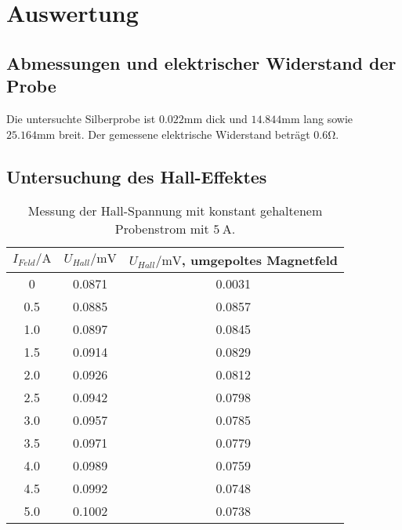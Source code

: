 \section{Auswertung}
  \subsection{Abmessungen und elektrischer Widerstand der Probe}
    Die untersuchte Silberprobe ist $0.022 \si{\milli\meter}$ dick und $14.844 \si{\milli\meter}$ lang sowie
    $25.164\si{\milli\meter}$ breit. Der gemessene elektrische Widerstand beträgt $0.6 \si{\ohm}$.
  \subsection{Untersuchung des Hall-Effektes}
    \begin{table}[H]
      \centering
        \caption{Messung der Hall-Spannung mit konstant gehaltenem Probenstrom mit $\SI{5}{\ampere}$.}
        \label{tab:hallspannung1}
        \begin{tabular}{S S S }
          \toprule
          {$I_{Feld} /\si{\ampere}$} & {$U_{Hall} /\si{\milli\volt}$} & {$U_{Hall} / \si{\milli\volt}$, umgepoltes Magnetfeld} \\
             & 0.0871 & 0.0031 \\
          0.5 & 0.0885 & 0.0857 \\
          1.0 & 0.0897 & 0.0845 \\
          1.5 & 0.0914 & 0.0829 \\
          2.0 & 0.0926 & 0.0812 \\
          2.5 & 0.0942 & 0.0798 \\
          3.0 & 0.0957 & 0.0785 \\
          3.5 & 0.0971 & 0.0779 \\
          4.0 & 0.0989 & 0.0759 \\
          4.5 & 0.0992 & 0.0748 \\
          5.0 & 0.1002 & 0.0738 \\
          \bottomrule
        \end{tabular}
      \end{table}
